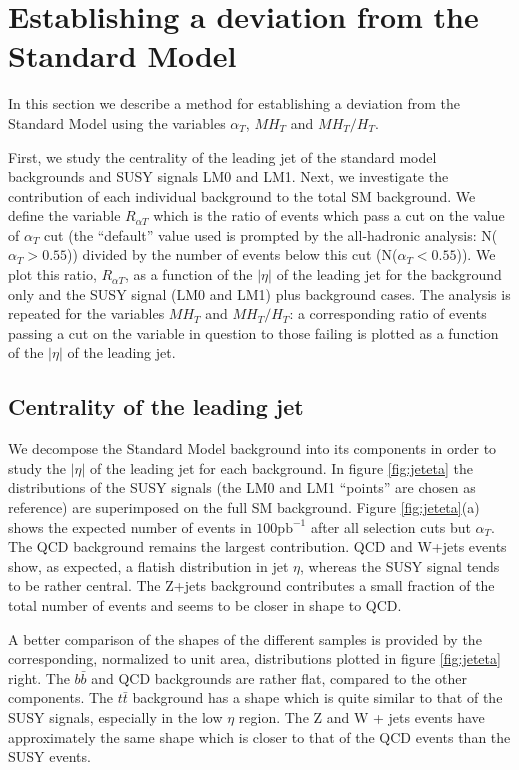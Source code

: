 \section{Establishing a deviation from the Standard Model}

In this section we describe a method for establishing a deviation from the Standard Model using the variables $\alpha_{T}$, $MH_{T}$ and $MH_{T}/H_{T}$.

First, we study the centrality of the leading jet of the standard model backgrounds and SUSY signals LM0 and LM1. Next, we investigate the contribution of each individual background to the total SM background. We define the variable $R_{\alpha T}$ which is the ratio of events which pass a cut on the value of $\alpha_{T}$ cut (the ``default'' value used is prompted by the all-hadronic analysis: N($\alpha_{T}>0.55$)) divided by the number of events below this cut (N($\alpha_{T}<0.55$)). We plot this ratio, $R_{\alpha T}$, as a function of the $|\eta|$ of the leading jet for the background only and the SUSY signal (LM0 and LM1) plus background cases. The analysis is repeated for the variables $MH_{T}$ and $MH_{T}/H_{T}$: a corresponding ratio of events passing a cut on the variable in question to those failing is plotted as a function of the $|\eta|$ of the leading jet.

\subsection{Centrality of the leading jet}

We decompose the Standard Model background into its components in order to study the $|\eta|$ of the leading jet for each background.  In figure \ref{fig:jeteta} the distributions of the SUSY signals (the LM0 and LM1 ``points'' are chosen as reference) are superimposed on the full SM background. Figure \ref{fig:jeteta}(a) shows the expected number of events in $100\textrm{pb}^{-1}$ after all selection cuts but $\alpha_{T}$.  The QCD background remains the largest contribution. QCD and W+jets events show, as expected, a flatish distribution in jet $\eta$, whereas the SUSY signal tends to be rather central. The Z+jets background contributes a small fraction of the total number of events and seems to be closer in shape to QCD.

A better comparison of the shapes of the different samples is provided by the corresponding, normalized to unit area, distributions plotted in figure \ref{fig:jeteta} right. The $b\bar{b}$ and QCD backgrounds are rather flat, compared to the other components. The $t\bar{t}$ background has a shape which is quite similar to that of the SUSY signals, especially in the low $\eta$ region.  The Z and W + jets events have approximately the same shape which is closer to that of the QCD events than the SUSY events.

